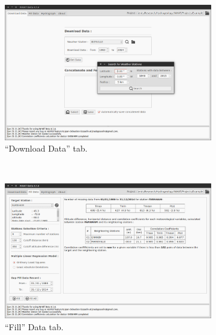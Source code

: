 \documentclass[12pt, letterpaper, fleqn]{report}
\begin{document}
\begin{figure}[h!]
        \centering
        \begin{subfigure}[t]{0.45\textwidth}
                \includegraphics[width=\textwidth]{WHAT_Screenshot000}
                \caption{``Download Data'' tab.}
                \label{subfig:ScnShot_000}                
        \end{subfigure}%
        ~
        \begin{subfigure}[t]{0.45\textwidth}
                \includegraphics[width=\textwidth]{WHAT_Screenshot001}
                \caption{``Fill'' Data tab.}
                \label{subfig:ScnShot_001}
        \end{subfigure}
        \\[0.5cm]
        \begin{subfigure}[t]{0.45\textwidth}

\end{subfigure}
\end{figure}
\end{document}
